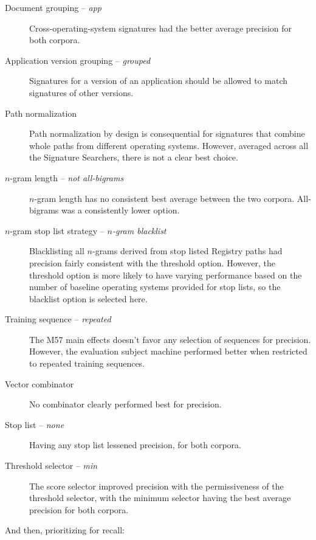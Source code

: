 \documentclass[11pt]{ucthesis}
\theoremstyle{plain}
\theoremstyle{definition}
\begin{document}
\begin{description}
\item[Document grouping -- \emph{app}] Cross-operating-system signatures had the better average precision for both corpora.  %
\item[Application version grouping -- \emph{grouped}] Signatures for a version of an application should be allowed to match signatures of other versions.  %
\item[Path normalization] Path normalization by design is consequential for signatures that combine whole paths from different operating systems.  However, averaged across all the Signature Searchers, there is not a clear best choice.  %
%
\item[$n$-gram length -- \emph{not all-bigrams}] $n$-gram length has no consistent best average between the two corpora.  All-bigrams was a consistently lower option.  %
%
\item[$n$-gram stop list strategy -- \emph{$n$-gram blacklist}] Blacklisting all $n$-grams derived from stop listed Registry paths had precision fairly consistent with the threshold option.  However, the threshold option is more likely to have varying performance based on the number of baseline operating systems provided for stop lists, so the blacklist option is selected here.  %
\item[Training sequence -- \emph{repeated}] The M57 main effects doesn't favor any selection of sequences for precision.  However, the evaluation subject machine performed better when restricted to repeated training sequences.  %
%
\item[Vector combinator] No combinator clearly performed best for precision.  %
\item[Stop list -- \emph{none}] Having any stop list lessened precision, for both corpora.  %
\item[Threshold selector -- \emph{min}] The score selector improved precision with the permissiveness of the threshold selector, with the minimum selector having the best average precision for both corpora.  %
\end{description}

And then, prioritizing for recall:
\end{document}
